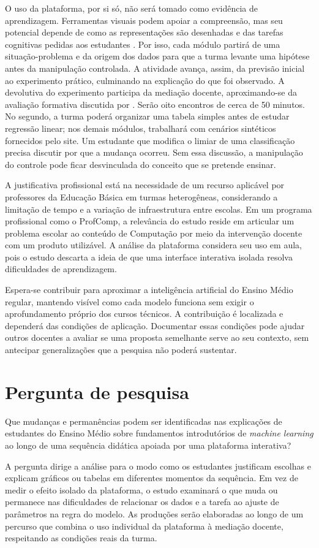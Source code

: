 O uso da plataforma, por si só, não será tomado como evidência de aprendizagem. Ferramentas visuais podem apoiar a compreensão, mas seu potencial depende de como as representações são desenhadas e das tarefas cognitivas pedidas aos estudantes \cite{ainsworth2006deft}. Por isso, cada módulo partirá de uma situação-problema e da origem dos dados para que a turma levante uma hipótese antes da manipulação controlada. A atividade avança, assim, da previsão inicial ao experimento prático, culminando na explicação do que foi observado. A devolutiva do experimento participa da mediação docente, aproximando-se da avaliação formativa discutida por . Serão oito encontros de cerca de 50 minutos. No segundo, a turma poderá organizar uma tabela simples antes de estudar regressão linear; nos demais módulos, trabalhará com cenários sintéticos fornecidos pelo site. Um estudante que modifica o limiar de uma classificação precisa discutir por que a mudança ocorreu. Sem essa discussão, a manipulação do controle pode ficar desvinculada do conceito que se pretende ensinar.

A justificativa profissional está na necessidade de um recurso aplicável por professores da Educação Básica em turmas heterogêneas, considerando a limitação de tempo e a variação de infraestrutura entre escolas. Em um programa profissional como o ProfComp, a relevância do estudo reside em articular um problema escolar ao conteúdo de Computação por meio da intervenção docente com um produto utilizável. A análise da plataforma considera seu uso em aula, pois o estudo descarta a ideia de que uma interface interativa isolada resolva dificuldades de aprendizagem.

Espera-se contribuir para aproximar a inteligência artificial do Ensino Médio regular, mantendo visível como cada modelo funciona sem exigir o aprofundamento próprio dos cursos técnicos. A contribuição é localizada e dependerá das condições de aplicação. Documentar essas condições pode ajudar outros docentes a avaliar se uma proposta semelhante serve ao seu contexto, sem antecipar generalizações que a pesquisa não poderá sustentar.

\section{Pergunta de pesquisa}

Que mudanças e permanências podem ser identificadas nas explicações de estudantes do Ensino Médio sobre fundamentos introdutórios de \textit{machine learning} ao longo de uma sequência didática apoiada por uma plataforma interativa?

A pergunta dirige a análise para o modo como os estudantes justificam escolhas e explicam gráficos ou tabelas em diferentes momentos da sequência. Em vez de medir o efeito isolado da plataforma, o estudo examinará o que muda ou permanece nas dificuldades de relacionar os dados e a tarefa ao ajuste de parâmetros na regra do modelo. As produções serão elaboradas ao longo de um percurso que combina o uso individual da plataforma à mediação docente, respeitando as condições reais da turma.
